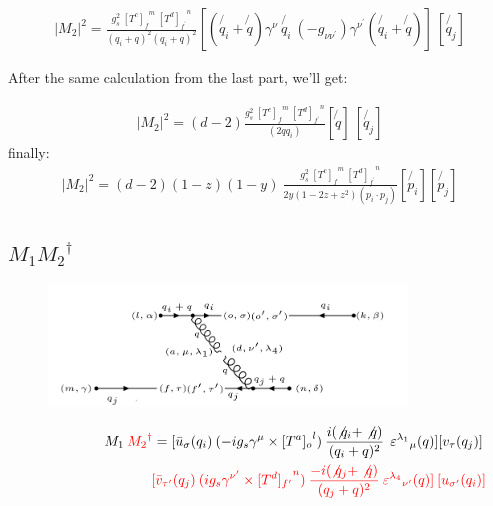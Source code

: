 \begin{equation}
\begin{split}
|M_2|^2 =\frac{g_s^2 \: {[T^c]_f}^m \: {[T^d]_{f^{\prime}}}^n }{(q_i + q)^2 (q_i + q)^2} [(\not{q_i} + \not{q}) \gamma^{\nu}  \:\not{q_i}\: (-g_{{\nu}{{\nu}^{\prime}}}) \gamma^{{\nu}^{\prime}}(\not{q_i} + \not{q})]\: 
[\not{q_j} ]
\end{split}
\end{equation}

After the same calculation from the last part, we'll get:

\begin{equation}
\begin{split}
|M_2|^2 =(d-2) \frac{g_s^2 \: {[T^c]_f}^m \: {[T^d]_{f^{\prime}}}^n }{(2qq_i)} [\not{q}]\: 
[\not{q_j} ]
\end{split}
\end{equation}
finally:
\begin{equation}
\begin{split}
|M_2|^2=(d-2)(1-z)(1-y)\:\frac{g_s^2 \: {[T^c]_f}^m \: {[T^d]_{f^{\prime}}}^n }{2y(1-2z+z^2)(p_i \cdot p_j)}
[\not{p_i}][\not{p_j}]
\end{split}
\end{equation}
\newpage



\newpage

\subsection{$M_1 {M_2}^{\dagger}$}

\begin{figure}[h!]
\centering
\includegraphics[width=0.85\textwidth]{images/M1M2Degaqqg.png}
\end{figure}

\begin{equation}
\begin{split}
M_1\:{\color[RGB]{255,0,0} {M_2}^{\dagger}} = [{\bar{u}}_{\sigma}(q_i)\: (-ig_s \gamma^{\mu}\times {[T^a]_o}^l) \: \frac{i(\not{q_i} + \not{q})}{(q_i + q)^2}\:\: {\varepsilon^{\lambda_1}}_{\mu} (q)] [{v}_{\tau}(q_j)]\: \\
\quad\quad\quad\quad\quad\quad\quad\quad\:\:{\color[RGB]{255,0,0}[\bar{v}_{{\tau}^{\prime}}(q_j) \: (ig_s \gamma^{{\nu}^{\prime}}\times {[T^d]_{f^{\prime}}}^n) \: \frac{-i(\not{q_j} + \not{q})}{(q_j + q)^2} \: {\varepsilon^{\lambda_4}}_{{\nu}^{\prime}} (q)]\: [{u}_{{\sigma}^{\prime}}(q_i)]}
\end{split}
\end{equation}



